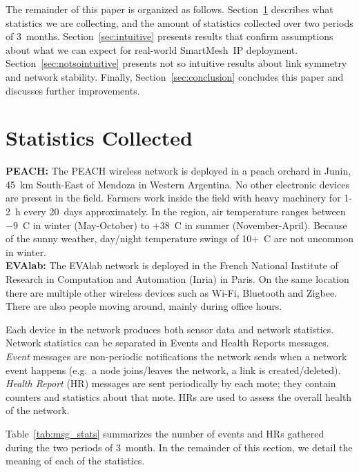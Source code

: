 \documentclass{elsarticle}
\newcommand{\smip}                {SmartMesh~IP\xspace}
\begin{document}

The remainder of this paper is organized as follows.
Section~\ref{sec:collected} describes what statistics we are collecting, and the amount of statistics collected over two periods of 3~months.
Section~\ref{sec:intuitive} presents results that confirm assumptions about what we can expect for real-world \smip deployment.
Section~\ref{sec:notsointuitive} presents not so intuitive results about link symmetry and network stability.
Finally, Section~\ref{sec:conclusion} concludes this paper and discusses further improvements.

\section{Statistics Collected}
\label{sec:collected}

\textbf{PEACH:}
The PEACH wireless network is deployed in a peach orchard in Junin, 45~km South-East of Mendoza in Western Argentina.
No other electronic devices are present in the field.
Farmers work inside the field with heavy machinery for 1-2~h every 20~days approximately.
In the region, air temperature ranges between $-$9~C in winter (May-October) to +38~C in summer (November-April).
Because of the sunny weather, day/night temperature swings of 10+~C are not uncommon in winter.
\\
\textbf{EVAlab:}
The EVAlab network is deployed in the French National Institute of Research in Computation and Automation (Inria) in Paris.
On the same location there are multiple other wireless devices such as Wi-Fi, Bluetooth and Zigbee.
There are also people moving around, mainly during office hours.


Each device in the network produces both sensor data and network statistics.
Network statistics can be separated in Events and Health Reports messages.
\textit{Event} messages are non-periodic notifications the network sends when a network event happens (e.g.~a node joins/leaves the network, a link is created/deleted).
\textit{Health Report} (HR) messages are sent periodically by each mote; they contain counters and statistics about that mote.
HRs are used to assess the overall health of the network.


Table~\ref{tab:msg_stats} summarizes the number of events and HRs gathered during the two periods of 3~month.
In the remainder of this section, we detail the meaning of each of the statistics.
\end{document}
